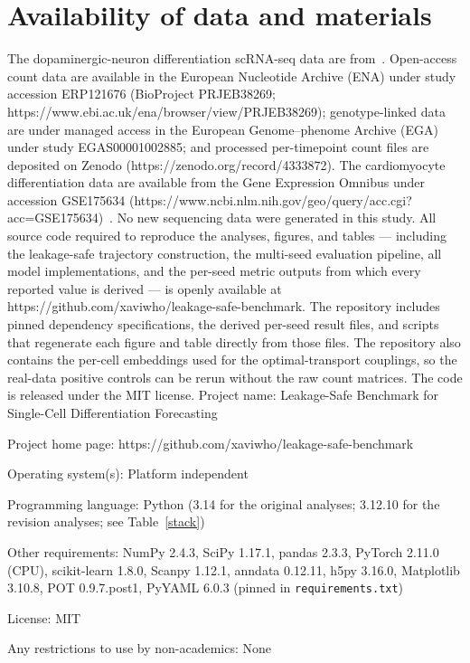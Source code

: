 \documentclass[pdflatex,sn-mathphys-num]{sn-jnl}
\theoremstyle{thmstyleone}%
\theoremstyle{thmstyletwo}%
\theoremstyle{thmstylethree}%
\begin{document}
 

\section{\textbf{Availability of data and materials}}

The dopaminergic-neuron differentiation scRNA-seq data are from~\cite{jerber2021population}. Open-access count data are available in the European Nucleotide Archive (ENA) under study accession ERP121676 (BioProject PRJEB38269; https://www.ebi.ac.uk/ena/browser/view/PRJEB38269); genotype-linked data are under managed access in the European Genome–phenome Archive (EGA) under study EGAS00001002885; and processed per-timepoint count files are deposited on Zenodo (https://zenodo.org/record/4333872). The cardiomyocyte differentiation data are available from the Gene Expression Omnibus under accession GSE175634 (https://www.ncbi.nlm.nih.gov/geo/query/acc.cgi?acc=GSE175634)~\cite{elorbany2022single}. No new sequencing data were generated in this study.
All source code required to reproduce the analyses, figures, and tables — including the leakage-safe trajectory construction, the multi-seed evaluation pipeline, all model implementations, and the per-seed metric outputs from which every reported value is derived — is openly available at https://github.com/xaviwho/leakage-safe-benchmark. The repository includes pinned dependency specifications, the derived per-seed result files, and scripts that regenerate each figure and table directly from those files. The repository also contains the per-cell embeddings used for the optimal-transport couplings, so the real-data positive controls can be rerun without the raw count matrices. The code is released under the MIT license.
Project name: Leakage-Safe Benchmark for Single-Cell Differentiation Forecasting

Project home page: https://github.com/xaviwho/leakage-safe-benchmark

Operating system(s): Platform independent

Programming language: Python (3.14 for the original analyses; 3.12.10 for the revision analyses; see Table~\ref{stack})

Other requirements: NumPy 2.4.3, SciPy 1.17.1, pandas 2.3.3, PyTorch 2.11.0 (CPU), scikit-learn 1.8.0, Scanpy 1.12.1, anndata 0.12.11, h5py 3.16.0, Matplotlib 3.10.8, POT 0.9.7.post1, PyYAML 6.0.3 (pinned in \texttt{requirements.txt})

License: MIT

Any restrictions to use by non-academics: None
\end{document}
